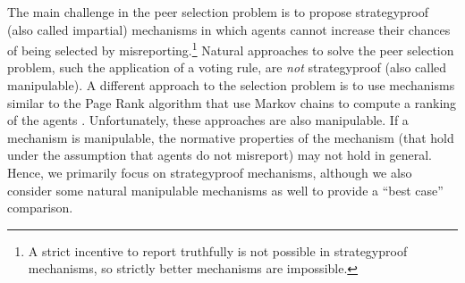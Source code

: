 \documentclass[letterpaper]{article}
\newcommand{\omer}[1]{\textcolor{purple}{\textbf{Omer Says: #1}}}
\newcommand{\citep}{\cite}
\begin{document}
The main challenge in the peer selection problem is to propose strategyproof (also called impartial) mechanisms in which agents cannot increase their chances of being selected by misreporting.\footnote{A strict incentive to report truthfully is not possible in strategyproof mechanisms, so strictly better mechanisms are impossible.}
Natural approaches to solve the peer selection problem, such the application of a voting rule, are \emph{not} strategyproof (also called manipulable).
A different approach to the selection problem is to use mechanisms similar to the Page Rank algorithm that use Markov chains to compute a ranking of the agents \cite{Wals14a}. Unfortunately, these approaches are also manipulable. If a mechanism is manipulable, the normative properties of the mechanism (that hold under the assumption that agents do not misreport) may not hold in general. Hence, we primarily focus on strategyproof mechanisms, although we also consider some natural manipulable mechanisms as well to provide a ``best case'' comparison.






\end{document}
